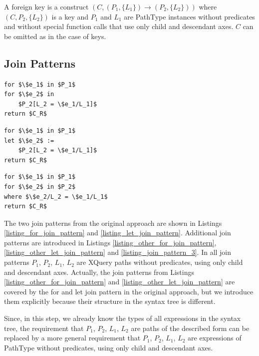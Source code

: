 \begin{define}
A foreign key is a construct $(C, (P_1, \{L_1\}) \rightarrow (P_2, \{L_2\}))$ where $(C, P_2, \{L_2\})$ is a key and $P_1$ and $L_1$ are PathType instances without predicates and without special function calls that use only child and descendant axes. $C$ can be omitted as in the case of keys.
\end{define}

\subsection{Join Patterns}

\begin{lstlisting}[mathescape, float, caption=Other form of the for join pattern., frame=single, label=listing_other_for_join_pattern]
for $\$e_1$ in $P_1$
for $\$e_2$ in
    $P_2[L_2 = \$e_1/L_1]$
return $C_R$
\end{lstlisting}

\begin{lstlisting}[mathescape, float, caption=Other form of the let join pattern., frame=single, label=listing_other_let_join_pattern]
for $\$e_1$ in $P_1$
let $\$e_2$ :=
    $P_2[L_2 = \$e_1/L_1]$
return $C_R$
\end{lstlisting}

\begin{lstlisting}[mathescape, float, caption=Join pattern 3., frame=single, label=listing_join_pattern_3]
for $\$e_1$ in $P_1$
for $\$e_2$ in $P_2$
where $\$e_2/L_2 = \$e_1/L_1$
return $C_R$
\end{lstlisting}

The two join patterns from the original approach are shown in Listings \ref{listing_for_join_pattern} and \ref{listing_let_join_pattern}. Additional join patterns are introduced in Listings \ref{listing_other_for_join_pattern}, \ref{listing_other_let_join_pattern} and \ref{listing_join_pattern_3}. In all join patterns $P_1$, $P_2$, $L_1$, $L_2$ are XQuery paths without predicates, using only child and descendant axes. Actually, the join patterns from Listings \ref{listing_other_for_join_pattern} and \ref{listing_other_let_join_pattern} are covered by the for and let join pattern in the original approach, but we introduce them explicitly because their structure in the syntax tree is different.

Since, in this step, we already know the types of all expressions in the syntax tree, the requirement that $P_1$, $P_2$, $L_1$, $L_2$ are paths of the described form can be replaced by a more general requirement that $P_1$, $P_2$, $L_1$, $L_2$ are expressions of PathType without predicates, using only child and descendant axes.

